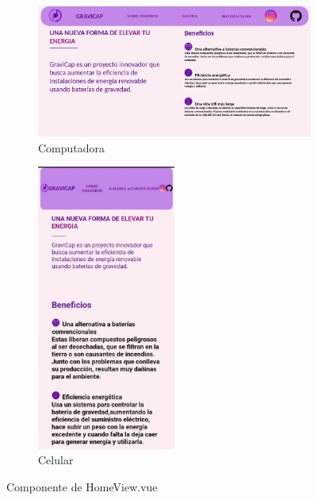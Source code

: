                     \begin{figure} [H]
                    \centering
                    \begin{subfigure}{0.5\textwidth}
                        \centering
                        \includegraphics[width=\textwidth]{Página Web/Computadora/HomeScreen.png}
                        \caption{Computadora}
                        \label{fig:pw2.1}
                    \end{subfigure}
                    \hfill
                    \begin{subfigure}{0.4\textwidth}
                        \centering
                        \includegraphics[width=0.5\textwidth]{Página Web/Celular/Homescreen.png}
                        \caption{Celular}
                        \label{fig:pw2.2}
                    \end{subfigure}
                    \hfill
                            
                    \caption{Componente de HomeView.vue}
                    \label{fig:pw2}
                    \end{figure}
                    
